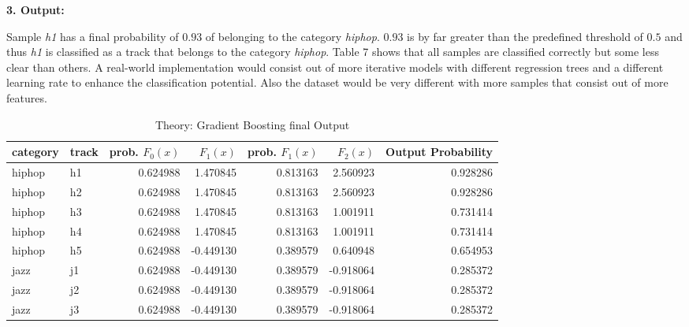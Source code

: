 \textbf{3. Output:}

Sample \emph{h1} has a final probability of \(0.93\) of belonging to the category \emph{hiphop}. \(0.93\) is by far greater than the 
predefined threshold of \(0.5\) and thus \emph{h1} is classified as a track that belongs to the category \emph{hiphop}. Table 7 shows
that all samples are classified correctly but some less clear than others. A real-world implementation would consist 
out of more iterative models with different regression trees and a different learning rate to enhance the 
classification potential. Also the dataset would be very different with more samples that consist out of more features. 

\begin{table}[H]
    \centering
    \begin{tabular}{llrrrrr}
        \toprule
        category & track &  prob. \(F_{0}(x)\) &    \(F_{1}(x)\) &  prob. \(F_{1}(x)\) &       \(F_{2}(x)\) &  Output Probability \\
        \midrule
          hiphop &    h1 &         0.624988 &  1.470845 &         0.813163 &  2.560923 &                          0.928286 \\
          hiphop &    h2 &         0.624988 &  1.470845 &         0.813163 &  2.560923 &                          0.928286 \\
          hiphop &    h3 &         0.624988 &  1.470845 &         0.813163 &  1.001911 &                          0.731414 \\
          hiphop &    h4 &         0.624988 &  1.470845 &         0.813163 &  1.001911 &                          0.731414 \\
          hiphop &    h5 &         0.624988 & -0.449130 &         0.389579 &  0.640948 &                          0.654953 \\
            jazz &    j1 &         0.624988 & -0.449130 &         0.389579 & -0.918064 &                          0.285372 \\
            jazz &    j2 &         0.624988 & -0.449130 &         0.389579 & -0.918064 &                          0.285372 \\
            jazz &    j3 &         0.624988 & -0.449130 &         0.389579 & -0.918064 &                          0.285372 \\
        \bottomrule
        \end{tabular}           
    \caption{Theory: Gradient Boosting final Output}%
    \label{tbl:theory_gb_final_output}%
  \end{table} 

